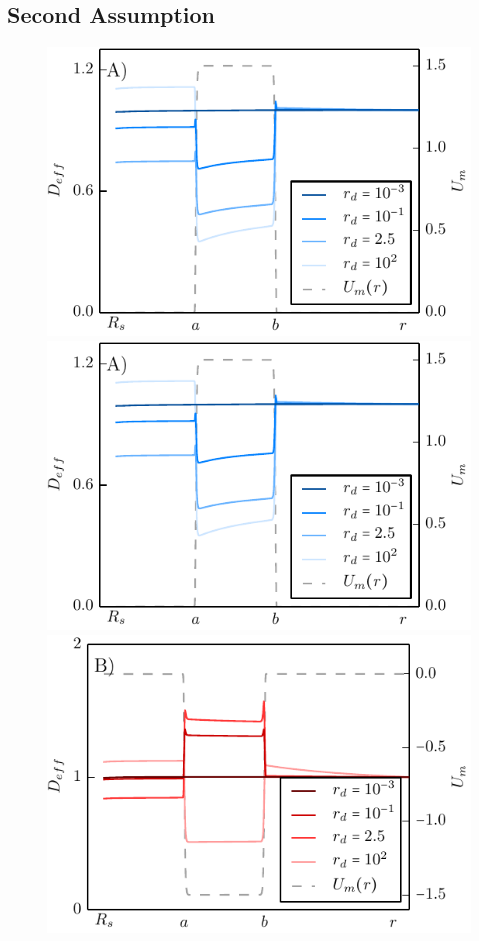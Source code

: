 \subsection{Second Assumption}
\begin{minipage}[t]{.63 \textwidth}
    \begin{figure}[H]
        \includegraphics[width = 1 \textwidth]{plots/repulsive_mapping_d.pdf}
        \includegraphics[width = 1 \textwidth]{plots/repulsive_mapping_d.pdf}
        \includegraphics[width = 1 \textwidth]{plots/attractive_mapping_d.pdf}
    \end{figure}
\end{minipage}
